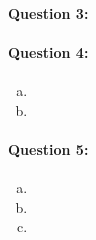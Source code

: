 \documentclass[letterpaper,11pt]{article}
\begin{document}
\paragraph{Question 3:}


\paragraph{Question 4:}
\begin{enumerate}[(a)]
\item
\item
\end{enumerate}

\paragraph{Question 5:}
\begin{enumerate}[(a)]
\item
\item
\item
\end{enumerate}
\end{document}
